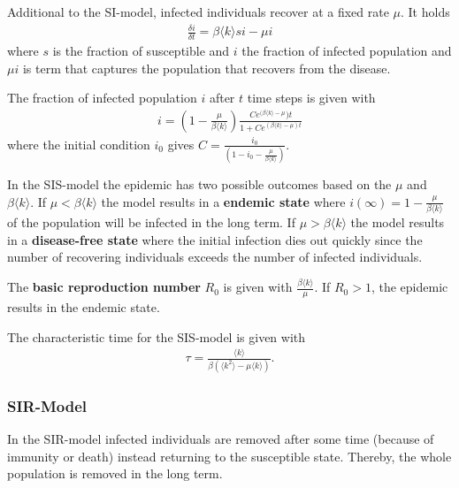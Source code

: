 \documentclass[english]{panikzettel}
\begin{document}
Additional to the SI-model, infected individuals recover at a fixed rate $ \mu $.
It holds
\begin{align*}
	\frac{\delta i}{\delta t} = \beta \langle k \rangle si - \mu i
\end{align*}
where $ s $ is the fraction of susceptible and $ i $ the fraction of infected population and $ \mu i $ is term that captures the population that recovers from the disease.

The fraction of infected population $ i $ after $ t $ time steps is given with
\begin{align*}
	i = \left(1 - \frac{\mu}{\beta \langle k \rangle}\right) \frac{C e^{(\beta \langle k \rangle - \mu}) t}{1 + C e^{(\beta \langle k \rangle - \mu) t}}
\end{align*}
where the initial condition $ i_0 $ gives $ C = \frac{i_0}{(1 - i_0 - \frac{\mu}{\beta \langle k \rangle})} $.

In the SIS-model the epidemic has two possible outcomes based on the $ \mu $ and $ \beta \langle k \rangle $.
If $ \mu < \beta \langle k \rangle $ the model results in a \textbf{endemic state} where $ i(\infty) = 1 - \frac{\mu}{\beta \langle k \rangle} $ of the population will be infected in the long term. 
If $ \mu > \beta \langle k \rangle $ the model results in a \textbf{disease-free state} where the initial infection dies out quickly since the number of recovering individuals exceeds the number of infected individuals.

The \textbf{basic reproduction number} $ R_0 $ is given with $ \frac{\beta \langle k \rangle}{\mu} $.
If $ R_0 > 1 $, the epidemic results in the endemic state.

The characteristic time for the SIS-model is given with
\begin{align*}
	\tau = \frac{\langle k \rangle}{\beta (\langle k^2 \rangle - \mu \langle k \rangle)}.
\end{align*}

\subsubsection{SIR-Model}
In the SIR-model infected individuals are removed after some time (because of immunity or death) instead returning to the susceptible state.	
Thereby, the whole population is removed in the long term.

\begin{figure}[ht!]
	\centering
\end{figure}
\end{document}
